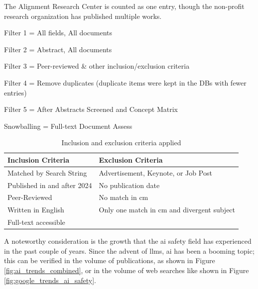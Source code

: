 \begin{table}[htbp]
\begin{threeparttable}
\begin{tabular}{lcccccc}
				\bottomrule
			\end{tabular}
			\begin{tablenotes}
				\small
				\item[*] The Alignment Research Center is counted as one entry, though the non-profit research organization has published multiple works.
				\item Filter 1 = All fields, All documents
				\item Filter 2 = Abstract, All documents
				\item Filter 3 = Peer-reviewed \& other inclusion/exclusion criteria
				\item Filter 4 = Remove duplicates (duplicate items were kept in the DBs with fewer entries)
				\item Filter 5 = After Abstracts Screened and Concept Matrix
				\item Snowballing = Full-text Document Assess
			\end{tablenotes}
		\end{threeparttable}
	\end{table}

	\begin{table}[htbp]
		\centering
		\caption{Inclusion and exclusion criteria applied}
		\label{tab:inclusion_exclusion_criteria}
		\begin{tabular}{@{}p{}p{}@{}}
			\toprule
			\textbf{Inclusion Criteria} & \textbf{Exclusion Criteria}                \\
			\midrule
			Matched by Search String    & Advertisement, Keynote, or Job Post        \\
			Published in and after 2024 & No publication date                        \\
			Peer-Reviewed               & No match in \gls{cm}             \\
			Written in English          & Only one match in \gls{cm} and divergent subject \\
			Full-text accessible        &                                            \\
			\bottomrule
		\end{tabular}
	\end{table}

	A noteworthy consideration is the growth that the \gls{ai} safety field has experienced in the past couple of years. Since the advent of \glspl{llm}, \gls{ai} has been a booming topic; this can be verified in the volume of publications, as shown in Figure \ref{fig:ai_trends_combined}, or in the volume of web searches like shown in Figure \ref{fig:google_trends_ai_safety}.

